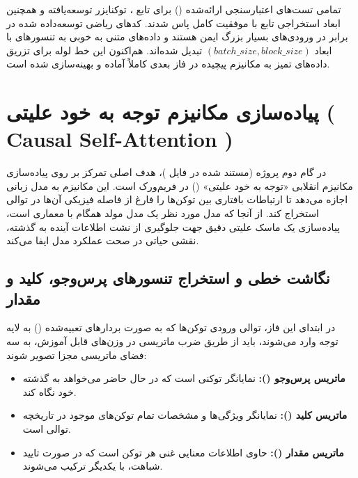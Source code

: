 \documentclass{article}
\begin{document}
\begin{tcolorbox}[
	colback=softpink,
	colframe=softred,
	title=خروجی نهایی \lr{init.ipynb},
	fonttitle=\bfseries\Large,
	coltitle=white
	]
	تمامی تست‌های اعتبارسنجی ارائه‌شده () برای تابع ، توکنایزر توسعه‌یافته و همچنین ابعاد استخراجی تابع  با موفقیت کامل پاس شدند. کدهای ریاضی توسعه‌داده شده در برابر  در ورودی‌های بسیار بزرگ ایمن هستند و داده‌های متنی به خوبی به تنسورهای  با ابعاد $(batch\_size, block\_size)$ تبدیل شده‌اند. هم‌اکنون این خط لوله برای تزریق داده‌های تمیز به مکانیزم پیچیده  در فاز بعدی کاملاً آماده و بهینه‌سازی شده است.
\end{tcolorbox}
\section{پیاده‌سازی مکانیزم توجه به خود علیتی ( Causal Self-Attention )}

\begin{tcolorbox}[
	colback=softgreen,
	colframe=mygreen,
	title=هدف اصلی فاز دوم پروژه,
	attach boxed title to top right={yshift=-2mm, xshift=-5mm},
	boxed title style={colback=mygreen, rounded corners}
	]
	در گام دوم پروژه (مستند شده در فایل )، هدف اصلی تمرکز بر روی پیاده‌سازی مکانیزم انقلابی «توجه به خود علیتی» () در فریم‌ورک  است. این مکانیزم به مدل زبانی اجازه می‌دهد تا ارتباطات بافتاری بین توکن‌ها را فارغ از فاصله فیزیکی آن‌ها در توالی استخراج کند. از آنجا که مدل مورد نظر یک مدل مولد همگام با معماری  است، پیاده‌سازی یک ماسک علیتی دقیق جهت جلوگیری از نشت اطلاعات آینده به گذشته، نقشی حیاتی در صحت عملکرد مدل ایفا می‌کند.
\end{tcolorbox}

\subsection{نگاشت خطی و استخراج تنسورهای پرس‌وجو، کلید و مقدار}
در ابتدای این فاز، توالی ورودی توکن‌ها که به صورت بردارهای تعبیه‌شده () به لایه توجه وارد می‌شوند، باید از طریق ضرب ماتریسی در وزن‌های قابل آموزش، به سه فضای ماتریسی مجزا تصویر شوند:
\begin{itemize}
	\item \textbf{ماتریس پرس‌وجو ():} نمایانگر توکنی است که در حال حاضر می‌خواهد به گذشته خود نگاه کند.
	\item \textbf{ماتریس کلید ():} نمایانگر ویژگی‌ها و مشخصات تمام توکن‌های موجود در تاریخچه توالی است.
	\item \textbf{ماتریس مقدار ():} حاوی اطلاعات معنایی غنی هر توکن است که در صورت تایید شباهت، با یکدیگر ترکیب می‌شوند.
\end{itemize}
\end{document}
